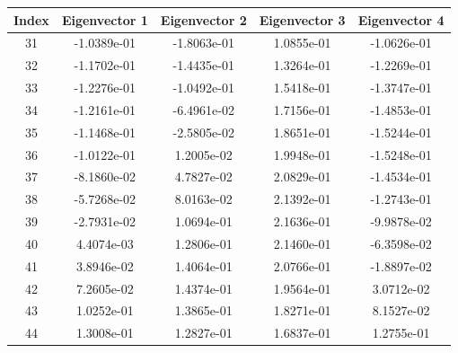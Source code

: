 \documentclass{article}
\begin{document}
\begin{table}[h!]                                            
\centering                                                  
\begin{tabular}{|c|c|c|c|c|}                                
\hline
Index & Eigenvector 1 & Eigenvector 2 & Eigenvector 3 & Eigenvector 4 \\
\hline                                                      
31 & -1.0389e-01 & -1.8063e-01 & 1.0855e-01 & -1.0626e-01 \\
\hline                                                      
32 & -1.1702e-01 & -1.4435e-01 & 1.3264e-01 & -1.2269e-01 \\
\hline                                                      
33 & -1.2276e-01 & -1.0492e-01 & 1.5418e-01 & -1.3747e-01 \\
\hline                                                      
34 & -1.2161e-01 & -6.4961e-02 & 1.7156e-01 & -1.4853e-01 \\
\hline                                                      
35 & -1.1468e-01 & -2.5805e-02 & 1.8651e-01 & -1.5244e-01 \\
\hline                                                      
36 & -1.0122e-01 & 1.2005e-02 & 1.9948e-01 & -1.5248e-01 \\ 
\hline                                                      
37 & -8.1860e-02 & 4.7827e-02 & 2.0829e-01 & -1.4534e-01 \\ 
\hline                                                      
38 & -5.7268e-02 & 8.0163e-02 & 2.1392e-01 & -1.2743e-01 \\ 
\hline                                                      
39 & -2.7931e-02 & 1.0694e-01 & 2.1636e-01 & -9.9878e-02 \\ 
\hline                                                      
40 & 4.4074e-03 & 1.2806e-01 & 2.1460e-01 & -6.3598e-02 \\  
\hline                                                      
41 & 3.8946e-02 & 1.4064e-01 & 2.0766e-01 & -1.8897e-02 \\  
\hline                                                      
42 & 7.2605e-02 & 1.4374e-01 & 1.9564e-01 & 3.0712e-02 \\   
\hline                                                      
43 & 1.0252e-01 & 1.3865e-01 & 1.8271e-01 & 8.1527e-02 \\   
\hline                                                      
44 & 1.3008e-01 & 1.2827e-01 & 1.6837e-01 & 1.2755e-01 \\   

\end{tabular}
\end{table}
\end{document}
